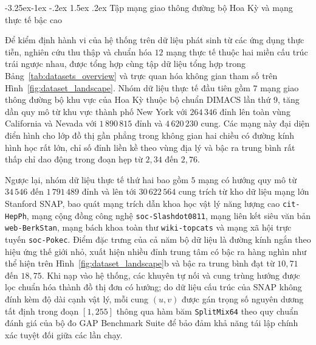 \documentclass[12pt,a4paper,openany,oneside]{report}
\makeatletter
\theoremstyle{plain}
\renewcommand\subsection{\@startsection{subsection}{2}{\z@}
    {-3.25ex\@plus -1ex \@minus -.2ex}
    {1.5ex \@plus .2ex}
    {\normalfont\normalsize\bfseries}}
\numberwithin{equation}{section}
\makeatother
\begin{document}
\subsection{Tập mạng giao thông đường bộ Hoa Kỳ và mạng thực tế bậc cao}\label{subsec:c3-data-real}

Để kiểm định hành vi của hệ thống trên dữ liệu phát sinh từ các ứng dụng thực tiễn, nghiên cứu thu thập và chuẩn hóa $12$ mạng thực tế thuộc hai miền cấu trúc trái ngược nhau, được tổng hợp cùng tập dữ liệu tổng hợp trong Bảng~\ref{tab:datasets_overview} và trực quan hóa không gian tham số trên Hình~\ref{fig:dataset_landscape}. Nhóm dữ liệu thực tế đầu tiên gồm $7$ mạng giao thông đường bộ khu vực của Hoa Kỳ thuộc bộ chuẩn DIMACS lần thứ 9, tăng dần quy mô từ khu vực thành phố New York với $264\,346$ đỉnh lên toàn vùng California và Nevada với $1\,890\,815$ đỉnh và $4\,620\,230$ cung. Các mạng này đại diện điển hình cho lớp đồ thị gần phẳng trong không gian hai chiều có đường kính hình học rất lớn, chỉ số đỉnh liền kề theo vùng địa lý và bậc ra trung bình rất thấp chỉ dao động trong đoạn hẹp từ $2{,}34$ đến $2{,}76$.

Ngược lại, nhóm dữ liệu thực tế thứ hai bao gồm $5$ mạng có hướng quy mô từ $34\,546$ đến $1\,791\,489$ đỉnh và lên tới $30\,622\,564$ cung trích từ kho dữ liệu mạng lớn Stanford SNAP, bao quát mạng trích dẫn khoa học vật lý năng lượng cao \texttt{cit-HepPh}, mạng cộng đồng công nghệ \texttt{soc-Slashdot0811}, mạng liên kết siêu văn bản \texttt{web-BerkStan}, mạng bách khoa toàn thư \texttt{wiki-topcats} và mạng xã hội trực tuyến \texttt{soc-Pokec}. Điểm đặc trưng của cả năm bộ dữ liệu là đường kính ngắn theo hiệu ứng thế giới nhỏ, xuất hiện nhiều đỉnh trung tâm có bậc ra hàng nghìn như thể hiện trên Hình~\ref{fig:dataset_landscape}b và bậc ra trung bình đạt từ $10{,}71$ đến $18{,}75$. Khi nạp vào hệ thống, các khuyên tự nối và cung trùng hướng được lọc chuẩn hóa thành đồ thị đơn có hướng; do dữ liệu cấu trúc của SNAP không đính kèm độ dài cạnh vật lý, mỗi cung $(u, v)$ được gán trọng số nguyên dương tất định trong đoạn $[1, 255]$ thông qua hàm băm \texttt{SplitMix64} theo quy chuẩn đánh giá của bộ đo GAP Benchmark Suite để bảo đảm khả năng tái lập chính xác tuyệt đối giữa các lần chạy.
\end{document}
